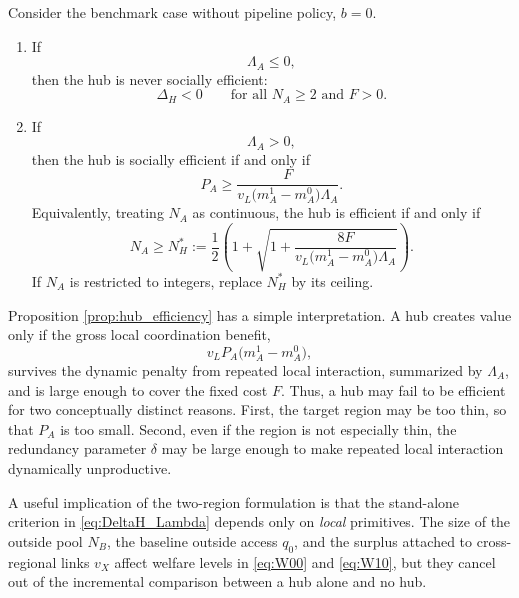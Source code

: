 \begin{proposition}
\label{prop:hub_efficiency}
Consider the benchmark case without pipeline policy, $b=0$.

\begin{enumerate}[leftmargin=2em]
    \item If
    \[
    \Lambda_A \le 0,
    \]
    then the hub is never socially efficient:
    \[
    \Delta_H < 0
    \qquad
    \text{for all } N_A \ge 2 \text{ and } F>0.
    \]

    \item If
    \[
    \Lambda_A > 0,
    \]
    then the hub is socially efficient if and only if
    \begin{equation}
    P_A
    \ge
    \frac{F}{v_L\bigl(m_A^1-m_A^0\bigr)\Lambda_A}.
    \label{eq:pair_threshold}
    \end{equation}
    Equivalently, treating $N_A$ as continuous, the hub is efficient if and only if
    \begin{equation}
    N_A \ge N_H^*
    :=
    \frac{1}{2}
    \left(
    1+
    \sqrt{
    1+
    \frac{8F}{v_L\bigl(m_A^1-m_A^0\bigr)\Lambda_A}
    }
    \right).
    \label{eq:Nstar}
    \end{equation}
    If $N_A$ is restricted to integers, replace $N_H^*$ by its ceiling.
\end{enumerate}
\end{proposition}

Proposition \ref{prop:hub_efficiency} has a simple interpretation. A hub creates value only if the gross local coordination benefit,
\[
v_L P_A \bigl(m_A^1-m_A^0\bigr),
\]
survives the dynamic penalty from repeated local interaction, summarized by $\Lambda_A$, and is large enough to cover the fixed cost $F$. Thus, a hub may fail to be efficient for two conceptually distinct reasons. First, the target region may be too thin, so that $P_A$ is too small. Second, even if the region is not especially thin, the redundancy parameter $\delta$ may be large enough to make repeated local interaction dynamically unproductive.

A useful implication of the two-region formulation is that the stand-alone criterion in \eqref{eq:DeltaH_Lambda} depends only on \emph{local} primitives. The size of the outside pool $N_B$, the baseline outside access $q_0$, and the surplus attached to cross-regional links $v_X$ affect welfare levels in \eqref{eq:W00} and \eqref{eq:W10}, but they cancel out of the incremental comparison between a hub alone and no hub.

